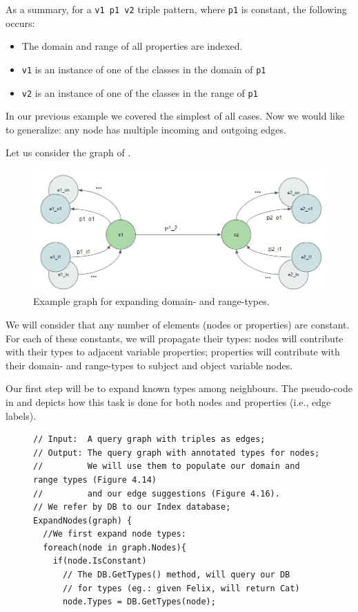 As a summary, for a \texttt{v1 p1 v2} triple pattern, where \texttt{p1} is constant, the following occurs:
\begin{itemize}
    \item The domain and range of all properties are indexed.
    \item \texttt{v1} is an instance of one of the classes in the domain of \texttt{p1}
    \item \texttt{v2} is an instance of one of the classes in the range of \texttt{p1}
\end{itemize}

In our previous example we covered the simplest of all cases. Now we would like to generalize: any node has multiple incoming and outgoing edges.

\begin{example}

Let us consider the graph of . 

\begin{figure}[h]
    \centering
        \includegraphics[width=\linewidth]{imagenes/graph2.png}
        \caption{Example graph for expanding domain- and range-types.}
        \label{fig:example_graph2}
\end{figure}

We will consider that any number of elements (nodes or properties) are constant. For each of these constants, we will propagate their types: nodes will contribute with their types to adjacent variable properties; properties will contribute with their domain- and range-types to subject and object variable nodes.

Our first step will be to expand known types among neighbours. The pseudo-code in  and  depicts how this task is done for both nodes and properties (i.e., edge labels).

\begin{figure}[h]
\begin{verbatim}
// Input:  A query graph with triples as edges;
// Output: The query graph with annotated types for nodes;
//         We will use them to populate our domain and range types (Figure 4.14) 
//         and our edge suggestions (Figure 4.16).
// We refer by DB to our Index database;
ExpandNodes(graph) {
  //We first expand node types:
  foreach(node in graph.Nodes){
    if(node.IsConstant)
      // The DB.GetTypes() method, will query our DB
      // for types (eg.: given Felix, will return Cat)
      node.Types = DB.GetTypes(node);


\end{verbatim}
\end{figure}
\end{example}
